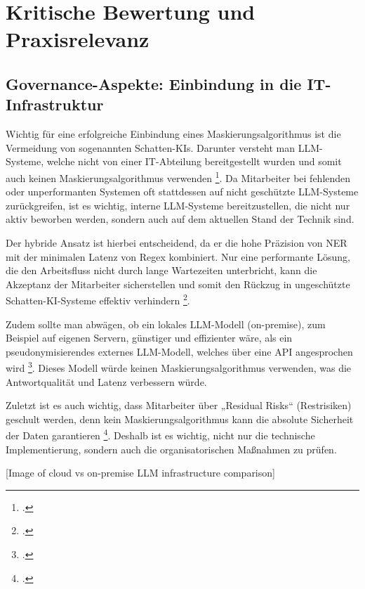 \chapter{Kritische Bewertung und Praxisrelevanz}

\section{Governance-Aspekte: Einbindung in die \ac{IT}-Infrastruktur}
Wichtig für eine erfolgreiche Einbindung eines Maskierungsalgorithmus ist die Vermeidung von sogenannten Schatten-\acp{KI}. Darunter versteht man \ac{LLM}-Systeme, welche nicht von einer \ac{IT}-Abteilung bereitgestellt wurden und somit auch keinen Maskierungsalgorithmus verwenden \footcite{mansner2025shadowai}.
Da Mitarbeiter bei fehlenden oder unperformanten Systemen oft stattdessen auf nicht geschützte \ac{LLM}-Systeme zurückgreifen, ist es wichtig, interne \ac{LLM}-Systeme bereitzustellen, die nicht nur aktiv beworben werden, sondern auch auf dem aktuellen Stand der Technik sind.

Der hybride Ansatz ist hierbei entscheidend, da er die hohe Präzision von \ac{NER} mit der minimalen Latenz von \ac{Regex} kombiniert. Nur eine performante Lösung, die den Arbeitsfluss nicht durch lange Wartezeiten unterbricht, kann die Akzeptanz der Mitarbeiter sicherstellen und somit den Rückzug in ungeschützte Schatten-KI-Systeme effektiv verhindern \footcite{naseer2025recap}.

Zudem sollte man abwägen, ob ein lokales \ac{LLM}-Modell (on-premise), zum Beispiel auf eigenen Servern, günstiger und effizienter wäre, als ein pseudonymisierendes externes \ac{LLM}-Modell, welches über eine \ac{API} angesprochen wird \footcite{costbenefit2025onprem}. Dieses Modell würde keinen Maskierungsalgorithmus verwenden, was die Antwortqualität und Latenz verbessern würde.

Zuletzt ist es auch wichtig, dass Mitarbeiter über „Residual Risks“ (Restrisiken) geschult werden, denn kein Maskierungsalgorithmus kann die absolute Sicherheit der Daten garantieren \footcite{staab2025sokprivacyparadox}. Deshalb ist es wichtig, nicht nur die technische Implementierung, sondern auch die organisatorischen Maßnahmen zu prüfen.

[Image of cloud vs on-premise LLM infrastructure comparison]

